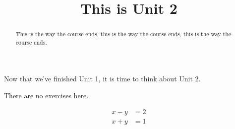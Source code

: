 \documentclass{ximera}
\title{This is Unit 2}
\begin{document}
\begin{abstract}
This is the way the course ends, this is the way the course ends, this is the way the course ends.
\end{abstract}

Now that we've finished Unit 1, it is time to think about Unit 2.


There are no exercises here.

\begin{align*}
  x-y &= 2 \\
  x+ y &= 1
\end{align*}
\end{document}
